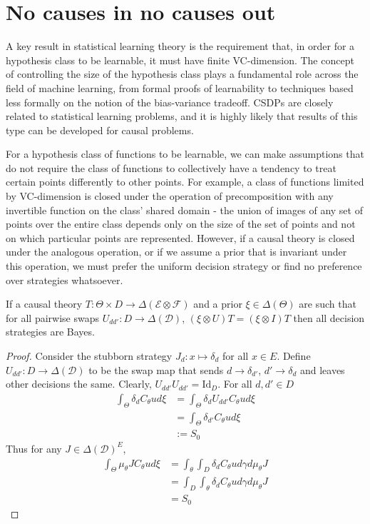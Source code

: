 
\section{No causes in no causes out}

A key result in statistical learning theory is the requirement that, in order for a hypothesis class to be learnable, it must have finite VC-dimension. The concept of controlling the size of the hypothesis class plays a fundamental role across the field of machine learning, from formal proofs of learnability to techniques based less formally on the notion of the bias-variance tradeoff. CSDPs are closely related to statistical learning problems, and it is highly likely that results of this type can be developed for causal problems.

For a hypothesis class of functions to be learnable, we can make assumptions that do not require the class of functions to collectively have a tendency to treat certain points differently to other points. For example, a class of functions limited by VC-dimension is closed under the operation of precomposition with any invertible function on the class' shared domain - the union of images of any set of points over the entire class depends only on the size of the set of points and not on which particular points are represented. However, if a causal theory is closed under the analogous operation, or if we assume a prior that is invariant under this operation, we must prefer the uniform decision strategy or find no preference over strategies whatsoever.

\begin{theorem}\label{th:ncinco}
If a causal theory $T:\Theta\times D\to \Delta(\mathcal{E}\otimes\mathcal{F})$ and a prior $\xi\in \Delta(\Theta)$ are such that for all pairwise swaps $U_{dd'}:D\to \Delta(\mathcal{D})$, $(\xi\otimes U)T = (\xi\otimes I)T$ then all decision strategies are Bayes.
\end{theorem}

\begin{proof}
Consider the stubborn strategy $J_d:x\mapsto \delta_d$ for all $x\in E$. Define $U_{dd'}:D\to \Delta(\mathcal{D})$ to be the swap map that sends $d\to \delta_{d'}$, $d'\to \delta_{d}$ and leaves other decisions the same. Clearly, $U_{dd'} U_{dd'} = \mathrm{Id}_D$. For all $d,d'\in D$
\begin{align}
	\int_\Theta \delta_d C_\theta u d\xi &= \int_\Theta \delta_d U_{dd'} C_\theta u d\xi\\
										&= \int_\Theta \delta_{d'} C_\theta u d\xi\\
										 &:= S_0
\end{align}
Thus for any $J\in \Delta(\mathcal{D})^E$,
\begin{align}
	\int_\Theta \mu_\theta J C_\theta u d\xi &= \int_\theta \int_D \delta_d C_\theta u d\gamma d\mu_\theta J\\
											 &= \int_D \int_\theta \delta_d C_\theta u d\gamma d\mu_\theta J\\
											 &= S_0
\end{align}
\end{proof}


